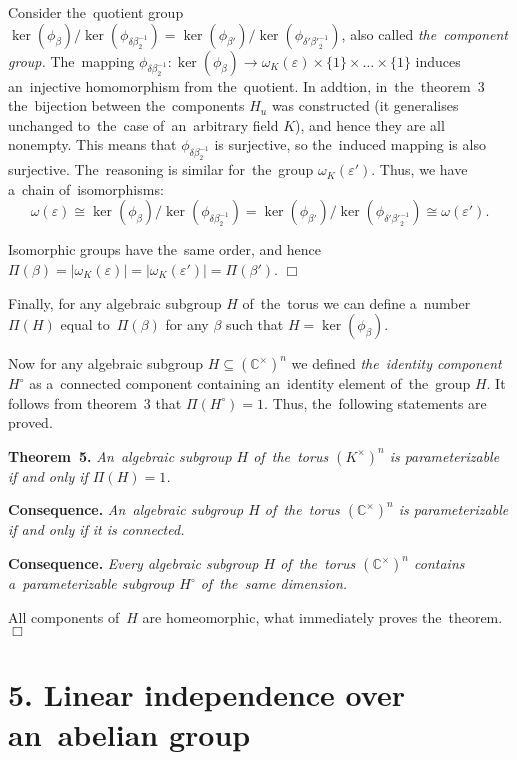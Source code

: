 \documentclass[twoside]{article}
\begin{document}
    Consider the~quotient group $\ker(\phi_\beta) / \ker(\phi_{\delta \beta_2^{-1}}) = \ker(\phi_{\beta'}) / \ker(\phi_{\delta' {\beta'}_2^{-1}})$,
    also called \textit{the~component group.} The~mapping $\phi_{\delta \beta_2^{-1}} : \ker(\phi_\beta) \rightarrow \omega_K(\varepsilon) \times \{ 1 \} \times \ldots \times \{ 1 \}$
    induces an~injective homomorphism from the~quotient. In addtion, in~the~theorem~3 the~bijection between the~components $H_u$
    was constructed (it generalises unchanged to~the~case of~an~arbitrary field $K$), and hence they are all nonempty.
    This means that $\phi_{\delta \beta_2^{-1}}$ is surjective, so the~induced mapping is also surjective.
    The~reasoning is similar for~the~group $\omega_K(\varepsilon')$. Thus, we have a~chain of~isomorphisms:
    $$
        \omega(\varepsilon) \cong \ker(\phi_\beta) / \ker(\phi_{\delta \beta_2^{-1}}) = \ker(\phi_{\beta'}) / \ker(\phi_{\delta' {\beta'}_2^{-1}}) \cong \omega(\varepsilon').
    $$

    Isomorphic groups have the~same order, and hence $\Pi(\beta) = |\omega_K(\varepsilon)| = |\omega_K(\varepsilon')| = \Pi(\beta')$.
\hfill$\Box$\medskip

Finally, for any algebraic subgroup $H$ of~the~torus we can define a~number $\Pi(H)$ equal to~$\Pi(\beta)$
for any $\beta$ such that $H = \ker(\phi_\beta)$.

Now for any algebraic subgroup $H \subseteq (\mathbb{C}^\times)^n$ we defined \textit{the~identity component} $H^\circ$
as a~connected component containing an~identity element of~the~group $H$. It follows from theorem~3
that $\Pi(H^\circ) = 1$. Thus, the~following statements are proved.

\medskip\noindent\textbf{Theorem~5.}\emph{
    An~algebraic subgroup $H$ of~the~torus $(K^\times)^n$ is parameterizable if and only if $\Pi(H) = 1$.
}

\medskip\noindent\textbf{Consequence.}\emph{
    An~algebraic subgroup $H$ of~the~torus $(\mathbb{C}^\times)^n$ is parameterizable if and only if it is connected.
}

\medskip\noindent\textbf{Consequence.}\emph{
    Every algebraic subgroup $H$ of~the~torus $(\mathbb{C}^\times)^n$ contains a~parameterizable subgroup $H^\circ$ of~the~same dimension.
}\medskip

    All components of~$H$ are homeomorphic, what immediately proves the~theorem.
\hfill$\Box$\medskip

\section*{5. Linear independence over an~abelian group}
\end{document}
